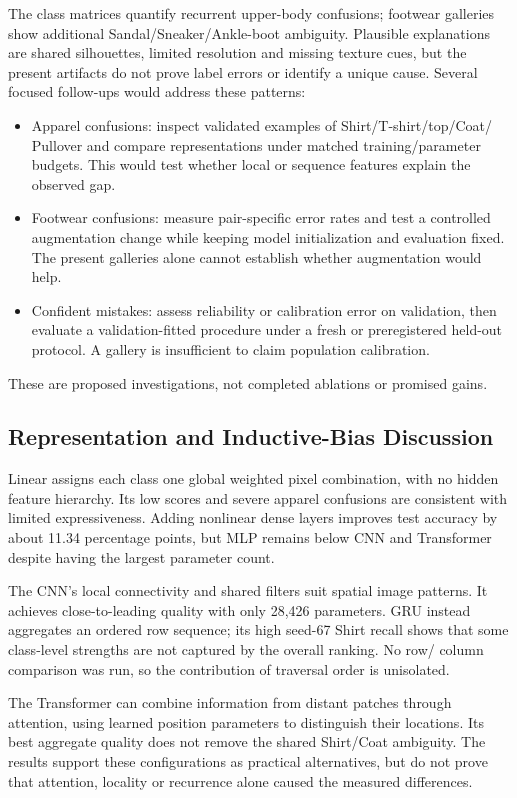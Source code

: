 The class matrices quantify recurrent upper-body confusions; footwear galleries
show additional Sandal/Sneaker/Ankle-boot ambiguity. Plausible explanations are
shared silhouettes, limited resolution and missing texture cues, but the
present artifacts do not prove label errors or identify a unique cause.
Several focused follow-ups would address these patterns:
\begin{itemize}
\item Apparel confusions: inspect validated examples of Shirt/T-shirt/top/Coat/
Pullover and compare representations under matched training/parameter budgets.
This would test whether local or sequence features explain the observed gap.
\item Footwear confusions: measure pair-specific error rates and test a controlled
augmentation change while keeping model initialization and evaluation fixed.
The present galleries alone cannot establish whether augmentation would help.
\item Confident mistakes: assess reliability or calibration error on validation,
then evaluate a validation-fitted procedure under a fresh or preregistered
held-out protocol. A gallery is insufficient to claim population calibration.
\end{itemize}
These are proposed investigations, not completed ablations or promised gains.

\subsection{Representation and Inductive-Bias Discussion}
Linear assigns each class one global weighted pixel combination, with no hidden
feature hierarchy. Its low scores and severe apparel confusions are consistent
with limited expressiveness. Adding nonlinear dense layers improves test accuracy
by about 11.34 percentage points, but MLP remains below CNN and Transformer
despite having the largest parameter count.

The CNN's local connectivity and shared filters suit spatial image patterns.
It achieves close-to-leading quality with only 28,426 parameters. GRU instead
aggregates an ordered row sequence; its high seed-67 Shirt recall shows that
some class-level strengths are not captured by the overall ranking. No row/
column comparison was run, so the contribution of traversal order is unisolated.

The Transformer can combine information from distant patches through attention,
using learned position parameters to distinguish their locations. Its best
aggregate quality does not remove the shared Shirt/Coat ambiguity.
The results support these configurations as practical alternatives, but do not
prove that attention, locality or recurrence alone caused the measured differences.

